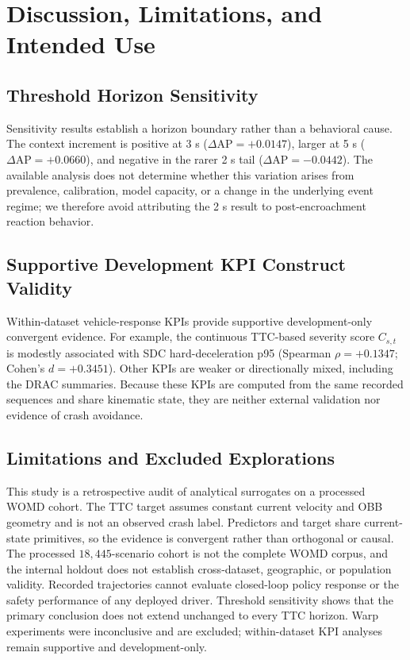 \section{Discussion, Limitations, and Intended Use}
\label{sec:limitations}

\subsection{Threshold Horizon Sensitivity}
Sensitivity results establish a horizon boundary rather than a behavioral cause. The context increment is positive at 3 s ($\Delta\text{AP} = +0.0147$), larger at 5 s ($\Delta\text{AP} = +0.0660$), and negative in the rarer 2 s tail ($\Delta\text{AP} = -0.0442$). The available analysis does not determine whether this variation arises from prevalence, calibration, model capacity, or a change in the underlying event regime; we therefore avoid attributing the 2 s result to post-encroachment reaction behavior.

\subsection{Supportive Development KPI Construct Validity}
Within-dataset vehicle-response KPIs provide supportive development-only convergent evidence. For example, the continuous TTC-based severity score $C_{s,t}$ is modestly associated with SDC hard-deceleration p95 (Spearman $\rho = +0.1347$; Cohen's $d = +0.3451$). Other KPIs are weaker or directionally mixed, including the DRAC summaries. Because these KPIs are computed from the same recorded sequences and share kinematic state, they are neither external validation nor evidence of crash avoidance.

\subsection{Limitations and Excluded Explorations}
This study is a retrospective audit of analytical surrogates on a processed WOMD cohort. The TTC target assumes constant current velocity and OBB geometry and is not an observed crash label. Predictors and target share current-state primitives, so the evidence is convergent rather than orthogonal or causal. The processed $18,445$-scenario cohort is not the complete WOMD corpus, and the internal holdout does not establish cross-dataset, geographic, or population validity. Recorded trajectories cannot evaluate closed-loop policy response or the safety performance of any deployed driver. Threshold sensitivity shows that the primary conclusion does not extend unchanged to every TTC horizon. Warp experiments were inconclusive and are excluded; within-dataset KPI analyses remain supportive and development-only.
